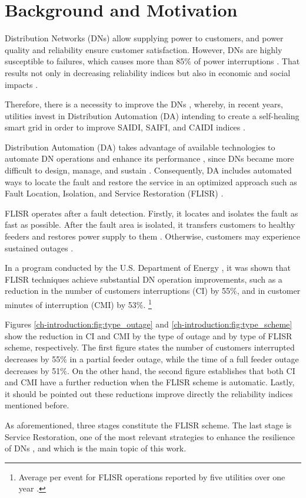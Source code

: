 \section{Background and Motivation}
\label{ch-introduction:sec:background}

Distribution Networks (DNs) allow supplying power to customers, and power quality and reliability ensure 
customer satisfaction. However, DNs are highly susceptible to failures, which causes more than 85$\%$ 
of power interruptions \cite{Liu2016}. That results not only in decreasing reliability indices but also in 
economic and social impacts \cite{Zidan2017}.

Therefore, there is a necessity to improve the DNs \cite{Kavousi-Fard2014}, whereby, in recent years, utilities 
invest in Distribution Automation (DA) intending to create a self-healing smart grid in order to improve 
SAIDI, SAIFI, and CAIDI indices \cite{Zidan2017}\cite{Angelo2013} \cite{Madani2015}. 

Distribution Automation (DA) takes advantage of available technologies to automate DN operations and enhance 
its performance \cite{U.S.DepartmentofEnergy2018}, since DNs became more difficult to 
design, manage, and sustain \cite{Madani2015}. Consequently, DA includes automated ways to locate the fault 
and restore the service in an optimized approach such as Fault Location, Isolation, and Service Restoration 
(FLISR) \cite{USDepartmentofEnergy2016} \cite{Liu2016}. 

FLISR operates after a fault detection. Firstly, it locates and isolates the fault as fast as possible. After 
the fault area is isolated, it transfers customers to healthy feeders and restores power supply to them 
\cite{Zidan2017}. Otherwise, customers may experience sustained outages \cite{USDepartmentofEnergy2016}. 

In a program conducted by the U.S. Department of Energy \cite{USDepartmentofEnergy2016}, it was shown that FLISR techniques achieve substantial 
DN operation improvements, such as a reduction in the number of customers interruptions (CI) by 55$\%$, and in 
customer minutes of interruption (CMI) by 53$\%$. \footnote{Average per event for FLISR operations reported by five utilities over one year \cite{USDepartmentofEnergy2016}.}




Figures \ref{ch-introduction:fig:type_outage} and \ref{ch-introduction:fig:type_scheme} show the reduction 
in CI and CMI by the type of outage and by type of FLISR scheme, respectively. The first figure states the 
number of customers interrupted decreases by 55$\%$ in a partial feeder outage, while the time of a full 
feeder outage decreases by 51$\%$. On the other hand, the second figure establishes that both CI and CMI 
have a further reduction when the FLISR scheme is automatic. Lastly, it should be pointed out these 
reductions improve directly the reliability indices mentioned before. 

As aforementioned, three stages constitute the FLISR scheme. The last stage is Service Restoration, one of the
most relevant strategies to enhance the resilience of DNs \cite{Shen2018}, and which is the main topic of this work.
